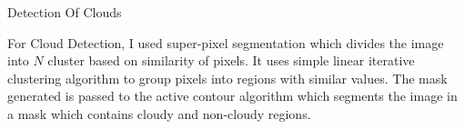 \documentclass[a4paper, 15pt]{article}
\begin{document}
	\newpage
	\begin{center}
		{\fontsize{20}{30}\selectfont Detection Of Clouds}\
	\end{center}
	\par
	For Cloud Detection, I used super-pixel segmentation which divides the image into $N$ cluster based on similarity of pixels. It uses simple linear iterative clustering algorithm to group pixels into regions with similar values. The mask generated is passed to the active contour algorithm which segments the image in a mask which contains cloudy and non-cloudy regions.
	\par
\end{document}
